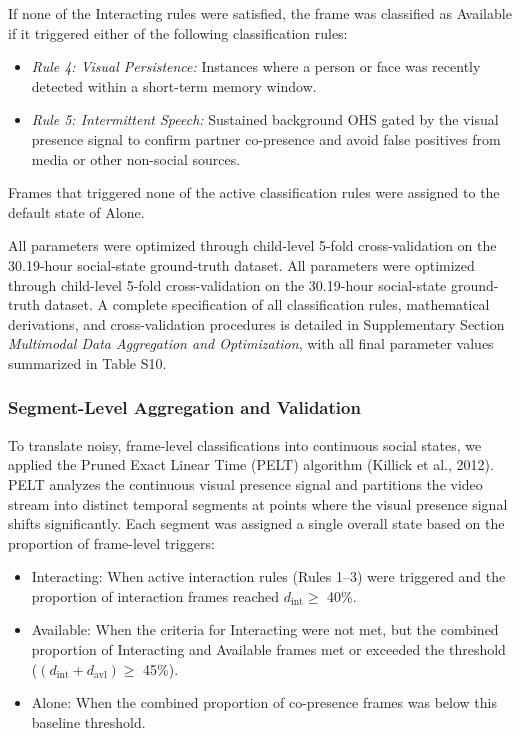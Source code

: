 \documentclass[
  english,
  12pt,
  man,floatsintext]{apa6}
\providecommand{\tightlist}{%
  \setlength{\itemsep}{0pt}\setlength{\parskip}{0pt}}
\begin{document}
If none of the Interacting rules were satisfied, the frame was classified as Available if it triggered either of the following classification rules:

\begin{itemize}
\tightlist
\item
  \emph{Rule 4: Visual Persistence:} Instances where a person or face was recently detected within a short-term memory window.
\item
  \emph{Rule 5: Intermittent Speech:} Sustained background OHS gated by the visual presence signal to confirm partner co-presence and avoid false positives from media or other non-social sources.
\end{itemize}

Frames that triggered none of the active classification rules were assigned to the default state of Alone.

All parameters were optimized through child-level 5-fold cross-validation on the 30.19-hour social-state ground-truth dataset. All parameters were optimized through child-level 5-fold cross-validation on the 30.19-hour social-state ground-truth dataset. A complete specification of all classification rules, mathematical derivations, and cross-validation procedures is detailed in Supplementary Section \emph{Multimodal Data Aggregation and Optimization}, with all final parameter values summarized in Table S10.

\subsubsection{Segment-Level Aggregation and Validation}\label{segment-level-aggregation}

To translate noisy, frame-level classifications into continuous social states, we applied the Pruned Exact Linear Time (PELT) algorithm (Killick et al., 2012). PELT analyzes the continuous visual presence signal and partitions the video stream into distinct temporal segments at points where the visual presence signal shifts significantly. Each segment was assigned a single overall state based on the proportion of frame-level triggers:

\begin{itemize}
\tightlist
\item
  Interacting: When active interaction rules (Rules 1--3) were triggered and the proportion of interaction frames reached \(d_{\text{int}} \ge\) 40\%.
\item
  Available: When the criteria for Interacting were not met, but the combined proportion of Interacting and Available frames met or exceeded the threshold (\((d_{\text{int}} +d_{\text{avl}}) \ge\) 45\%).
\item
  Alone: When the combined proportion of co-presence frames was below this baseline threshold.
\end{itemize}
\end{document}
